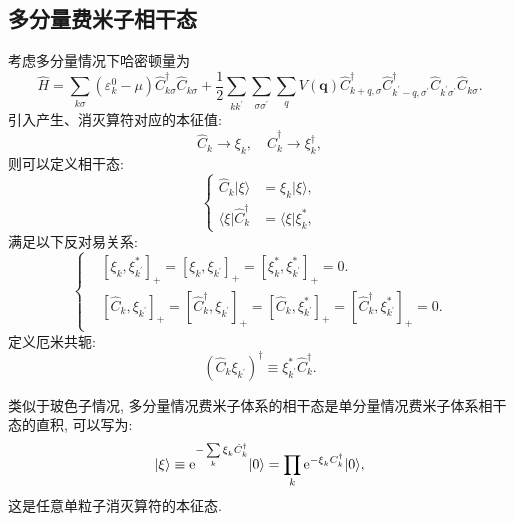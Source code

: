 \subsection{多分量费米子相干态}
考虑多分量情况下哈密顿量为
\begin{equation}
\hat{H}=\sum_{k \sigma}\left(\varepsilon_{k}^{0}-\mu\right) \hat{C}_{k \sigma}^{\dagger} \hat{C}^{}_{k \sigma}+\frac{1}{2} \sum_{k k^{\prime}} \sum_{\sigma \sigma^\prime} \sum_{q} V(\boldsymbol{q}) \hat{C}_{k+q , \sigma}^{\dagger} \hat{C}_{k^{\prime}- q,\sigma^\prime }^{\dagger} \hat{C}^{}_{k^{\prime} \sigma^{\prime}} \hat{C}^{}_{k \sigma}.
\end{equation}
引入产生、消灭算符对应的本征值:
\begin{equation}
\hat{C}^{}_{k} \rightarrow \xi^{}_{k} ,\quad \hat{C}_{k}^{\dagger} \rightarrow \xi_{k}^{\dagger},
\end{equation}
则可以定义相干态:
\begin{equation}
\left\{\begin{aligned}
\hat{C}_{k} |\xi\rangle&=\xi_{k}|\xi\rangle,\\
\langle\xi| \hat{C}_{k}^{\dagger}&=\langle\xi|\xi_{k}^{*},
\end{aligned}\right.
\end{equation}
满足以下反对易关系:
\begin{equation}
\left\{\begin{aligned}
&{\left[\xi^{}_{k}, \xi_{k^{\prime}}^{*}\right]_{+}=\left[\xi^{}_{k}, \xi^{}_{k^{\prime}}\right]_{+}=\left[\xi_{k}^{*}, \xi_{k^{\prime}}^{*}\right]_{+}=0 .} \\ 
&{\left[\hat{C}^{}_{k}, \xi^{}_{k^{\prime}}\right]_{+}=\left[\hat{C}_{k}^{\dagger}, \xi^{}_{k^{\prime}}\right]_{+}=\left[\hat{C}^{}_{k}, \xi_{k^{\prime}}^{*}\right]_{+}=\left[\hat{C}_{k}^{\dagger}, \xi_{k^{\prime}}^{*}\right]_{+}=0 .}\end{aligned}\right.
\end{equation}
定义厄米共轭:
\begin{equation}
\left(\hat{C}^{}_{k} \xi^{}_{k^{\prime}}\right)^{\dagger} \equiv \xi_{k^{\prime}}^{*} \hat{C}_{k}^{\dagger}.
\end{equation}

类似于玻色子情况, 多分量情况费米子体系的相干态是单分量情况费米子体系相干态的直积, 可以写为:
\begin{equation}
|\xi\rangle\equiv\mathrm{e}^{-\sum\limits_{k} \xi^{}_{k} \hat{C}_{k}^{\dagger}}|0\rangle=\prod_{k} \mathrm{e}^{-\xi^{}_{k} C_{k}^{\dagger}}|0\rangle,
\end{equation}
这是任意单粒子消灭算符的本征态. 

